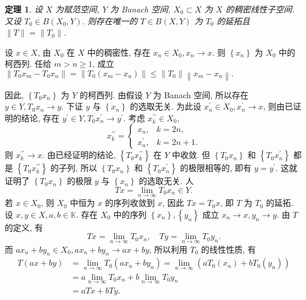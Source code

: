 \documentclass[openany]{ctexbook}
\makeatletter
\theoremstyle{kaiti}
\newtheorem{theorem}{定理}[section]
\theoremstyle{normal}
\renewenvironment{proof}[1][\proofname]{\par
    \pushQED{\qed}%
    \normalfont \topsep6\p@\@plus6\p@\relax
    \trivlist
    \item\relax
    {\heiti #1}\hspace{2\labelsep}\ignorespaces
  }{%
    \popQED\endtrivlist\@endpefalse
  }
\makeatother
\begin{document}
\begin{theorem}
  设 $X$ 为赋范空间, $Y$ 为 Banach 空间, $X_0 \subset X$ 为 $X$ 的稠密线性子空间. 又设 $T_0 \in B\left(X_0, Y\right)$. 则存在唯一的 $T \in B(X, Y)$ 为 $T_0$ 的延拓且 $\|T\|=\left\|T_0\right\|$.
\end{theorem}

\begin{proof}
设 $x \in X$, 由 $X_0$ 在 $X$ 中的稠密性, 存在 $x_n \in X_0, x_n \rightarrow x$. 则 $\left\{x_n\right\}$ 为 $X_0$ 中的柯西列. 任给 $m>n \geqslant 1$, 成立
$\left\|T_0 x_m-T_0 x_n\right\|=\left\|T_0\left(x_m-x_n\right)\right\| \leqslant\left\|T_0\right\|\left\|x_m-x_n\right\|.$

因此, $\left\{T_0 x_n\right\}$ 为 $Y$ 的柯西列. 由假设 $Y$ 为 Banach 空间, 所以存在 $y \in Y, T_0 x_n \rightarrow y$. 下证 $y$ 与 $\left\{x_n\right\}$ 的选取无关. 为此设 $x_n^{\prime} \in X_0, x_n^{\prime} \rightarrow x$, 则由已证明的结论, 存在 $y^{\prime} \in Y, T_0 x_n^{\prime} \rightarrow y^{\prime}$. 考虑 $x_{k}^{\prime \prime} \in X_0$,
$$
x_{k}^{\prime \prime}= \begin{cases}x_n, & k=2 n, \\ x_n^{\prime}, & k=2 n+1.\end{cases}
$$
则 $x_{k}^{\prime \prime} \rightarrow x$. 由已经证明的结论, $\left\{T_0 x_{k}^{\prime \prime}\right\}$ 在 $Y$ 中收敛. 但 $\left\{T_0 x_n\right\}$ 和 $\left\{T_0 x_n^{\prime}\right\}$ 都是 $\left\{T_0 x_{k}^{\prime \prime}\right\}$ 的子列, 所以 $\left\{T_0 x_n\right\}$ 和 $\left\{T_0 x_n^{\prime}\right\}$ 的极限相等的, 即有 $y=y^{\prime}$. 这就证明了 $\left\{T_0 x_n\right\}$ 的极限 $y$ 与 $\left\{x_n\right\}$ 的选取无关. 人
$$
T x=\lim_{n \rightarrow \infty} T_0 x_n \in Y.
$$
若 $x \in X_0$, 则 $X_0$ 中恒为 $x$ 的序列收敛到 $x$, 因此 $T x=T_0 x$, 即 $T$ 为 $T_0$ 的延拓.
设 $x, y \in X, a, b \in \mathbb{K}$. 存在 $X_0$ 中的序列 $\left\{x_n\right\},\left\{y_n\right\}$ 成立 $x_n \rightarrow x, y_n \rightarrow y$. 由 $T$ 的定义, 有
$$
T x=\lim_{n \rightarrow \infty} T_0 x_n, \quad T y=\lim_{n \rightarrow \infty} T_0 y_n.
$$
而 $a x_n+b y_n \in X_0, a x_n+b y_n \rightarrow a x+b y$, 所以利用 $T_0$ 的线性性质, 有
$$
\begin{aligned}
T(a x+b y) &=\lim_{n \rightarrow \infty} T_0\left(a x_n+b y_n\right)=\lim_{n \rightarrow \infty}\left(a T_0\left(x_n\right)+b T_0\left(y_n\right)\right) \\
&=a \lim_{n \rightarrow \infty} T_0 x_n+b \lim_{n \rightarrow \infty} T_0 y_n \\
&=a T x+b T y.
\end{aligned}
$$
\end{proof}
\end{document}
